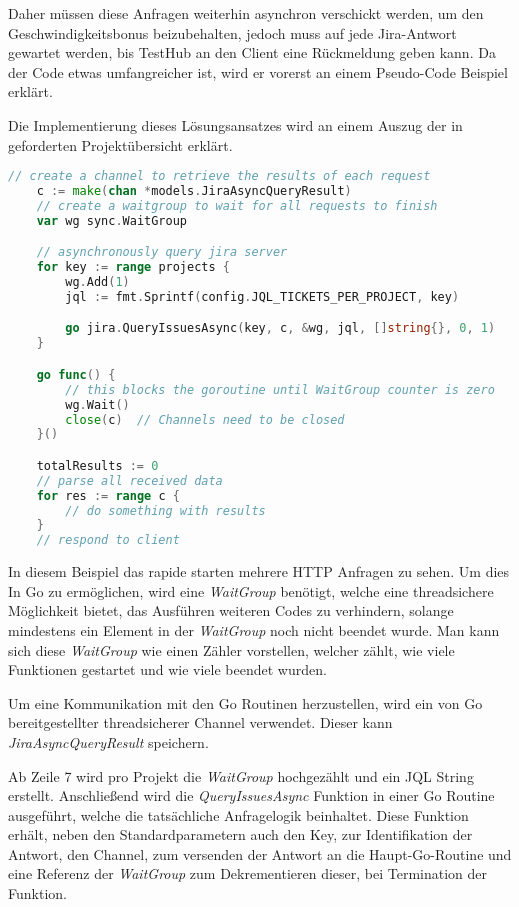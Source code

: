 Daher müssen diese Anfragen weiterhin asynchron verschickt werden, um den Geschwindigkeitsbonus
beizubehalten, jedoch muss auf jede Jira-Antwort gewartet werden, bis TestHub an
den Client eine Rückmeldung geben kann. Da der Code etwas umfangreicher ist, wird er vorerst 
an einem Pseudo-Code Beispiel erklärt.

Die Implementierung dieses Lösungsansatzes wird an einem Auszug der in 
geforderten Projektübersicht erklärt.


\begin{lstlisting}[caption=Go Umsetzung von asynchronen HTTP Anfragen (\textit{backend/api/api\_jira.go}), language=Go]
    // create a channel to retrieve the results of each request
    c := make(chan *models.JiraAsyncQueryResult)
    // create a waitgroup to wait for all requests to finish
    var wg sync.WaitGroup

    // asynchronously query jira server
    for key := range projects {
        wg.Add(1)
        jql := fmt.Sprintf(config.JQL_TICKETS_PER_PROJECT, key)

        go jira.QueryIssuesAsync(key, c, &wg, jql, []string{}, 0, 1)
    }

    go func() {
        // this blocks the goroutine until WaitGroup counter is zero
        wg.Wait() 
        close(c)  // Channels need to be closed
    }()

    totalResults := 0
    // parse all received data
    for res := range c {
        // do something with results
    }
    // respond to client
\end{lstlisting}

In diesem Beispiel das rapide starten mehrere HTTP Anfragen zu sehen. Um dies In
Go zu ermöglichen, wird eine \textit{WaitGroup} benötigt, welche eine \gls{threadsicher}e
Möglichkeit bietet, das Ausführen weiteren Codes zu verhindern, solange mindestens
ein Element in der \textit{WaitGroup} noch nicht beendet wurde. Man kann sich diese
\textit{WaitGroup} wie einen Zähler vorstellen, welcher zählt, wie viele Funktionen
gestartet und wie viele beendet wurden.

Um eine Kommunikation mit den Go Routinen herzustellen, wird ein von Go 
bereitgestellter \gls{threadsicher}er Channel verwendet. 
Dieser kann \textit{JiraAsyncQueryResult} speichern. 

Ab Zeile 7 wird pro Projekt die \textit{WaitGroup} hochgezählt und ein \gls{JQL}
String erstellt. Anschließend wird die \textit{QueryIssuesAsync} Funktion in einer
Go Routine ausgeführt, welche die tatsächliche Anfragelogik beinhaltet. Diese Funktion
erhält, neben den Standardparametern auch den Key, zur Identifikation der Antwort,
den Channel, zum versenden der Antwort an die Haupt-Go-Routine und eine Referenz 
der \textit{WaitGroup} zum Dekrementieren dieser, bei Termination der Funktion.


